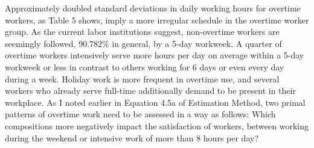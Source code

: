 \documentclass[
  12pt,
]{article}
\begin{document}
Approximately doubled standard deviations in daily working hours for
overtime workers, as Table 5 shows, imply a more irregular schedule in
the overtime worker group. As the current labor institutions suggest,
non-overtime workers are seemingly followed, 90.782\% in general, by a
5-day workweek. A quarter of overtime workers intensively serve more
hours per day on average within a 5-day workweek or less in contrast to
others working for 6 days or even every day during a week. Holiday work
is more frequent in overtime use, and several workers who already serve
full-time additionally demand to be present in their workplace. As I
noted earlier in Equation 4.5a of Estimation Method, two primal patterns
of overtime work need to be assessed in a way as follows: Which
compositions more negatively impact the satisfaction of workers, between
working during the weekend or intensive work of more than 8 hours per
day?
\end{document}
